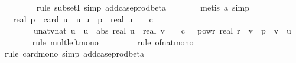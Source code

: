 \begin{isabellebody}
\ \ \ \ \ \ \ \isamarkupfalse%
\ {\isacharparenleft}{\kern0pt}rule\ subsetI{\isacharcomma}{\kern0pt}\ simp\ add{\isacharcolon}{\kern0pt}case{\isacharunderscore}{\kern0pt}prod{\isacharunderscore}{\kern0pt}beta{\isacharparenright}{\kern0pt}\isanewline
\ \ \ \ \ \ \isamarkupfalse%
\ {\isacharparenleft}{\kern0pt}metis\ a{}{\isacharunderscore}{\kern0pt}{}{\isacharcomma}{\kern0pt}\ simp{\isacharparenright}{\kern0pt}\isanewline
\ \ \ \ \isamarkupfalse%
\ \isamarkupfalse%
\ {\isachardoublequoteopen}{\isachardot}{\kern0pt}{\isachardot}{\kern0pt}{\isachardot}{\kern0pt}\ {\isasymle}\ {}{\isacharslash}{\kern0pt}{\isacharparenleft}{\kern0pt}real\ p{\isacharparenright}{\kern0pt}\ {\isacharasterisk}{\kern0pt}\ card\ {\isacharparenleft}{\kern0pt}{\isasymUnion}u{\isacharprime}{\kern0pt}\ {\isasymin}\ {\isacharbraceleft}{\kern0pt}u{\isachardot}{\kern0pt}\ u\ {\isacharless}{\kern0pt}\ p\ {\isasymand}\ real\ u\ {\isasymle}\ {}\ {\isacharasterisk}{\kern0pt}\ c{\isacharbraceright}{\kern0pt}{\isachardot}{\kern0pt}\isanewline
\ \ \ \ \ \ \ \ {\isacharbraceleft}{\kern0pt}{\isacharparenleft}{\kern0pt}u{\isacharcolon}{\kern0pt}{\isacharcolon}{\kern0pt}nat{\isacharcomma}{\kern0pt}v{\isacharcolon}{\kern0pt}{\isacharcolon}{\kern0pt}nat{\isacharparenright}{\kern0pt}{\isachardot}{\kern0pt}\ u\ {\isacharequal}{\kern0pt}\ u{\isacharprime}{\kern0pt}\ {\isasymand}\ abs\ {\isacharparenleft}{\kern0pt}real\ u\ {\isacharminus}{\kern0pt}\ real\ v{\isacharparenright}{\kern0pt}\ {\isasymle}\ {}\ {\isacharasterisk}{\kern0pt}\ c\ {\isacharasterisk}{\kern0pt}\ {}\ powr\ {\isacharparenleft}{\kern0pt}{\isacharminus}{\kern0pt}real\ r{\isacharparenright}{\kern0pt}\ {\isasymand}\ v\ {\isacharless}{\kern0pt}\ p\ {\isasymand}\ v\ {\isasymnoteq}\ u{\isacharprime}{\kern0pt}{\isacharbraceright}{\kern0pt}{\isacharparenright}{\kern0pt}{\isachardoublequoteclose}\isanewline
\ \ \ \ \ \ \isamarkupfalse%
\ {\isacharparenleft}{\kern0pt}rule\ mult{\isacharunderscore}{\kern0pt}left{\isacharunderscore}{\kern0pt}mono{\isacharparenright}{\kern0pt}\isanewline
\ \ \ \ \ \ \ \isamarkupfalse%
\ {\isacharparenleft}{\kern0pt}rule\ of{\isacharunderscore}{\kern0pt}nat{\isacharunderscore}{\kern0pt}mono{\isacharparenright}{\kern0pt}\isanewline
\ \ \ \ \ \ \ \isamarkupfalse%
\ {\isacharparenleft}{\kern0pt}rule\ card{\isacharunderscore}{\kern0pt}mono{\isacharcomma}{\kern0pt}\ simp\ add{\isacharcolon}{\kern0pt}case{\isacharunderscore}{\kern0pt}prod{\isacharunderscore}{\kern0pt}beta{\isacharparenright}{\kern0pt}\isanewline

\end{isabellebody}
